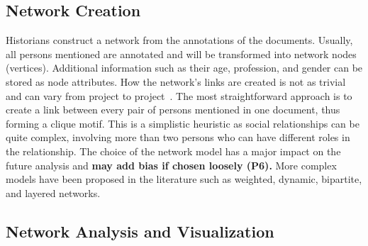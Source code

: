 \subsection{Network Creation}
Historians construct a network from the annotations of the documents.
Usually, all persons mentioned are annotated and will be transformed into network nodes (vertices).
Additional information such as their age, profession, and gender can be stored as node attributes.
How the network's links are created is not as trivial and can vary from project to project~\cite{alkadi2022}.
The most straightforward approach is to create a link between every pair of persons mentioned in one document, thus forming a clique motif.
This is a simplistic heuristic as social relationships can be quite complex, involving more than two persons who can have different roles in the relationship.
The choice of the network model has a major impact on the future analysis and \textbf{may add bias if chosen loosely (P6).}
More complex models have been proposed in the literature such as weighted, dynamic, bipartite, and layered networks. %


\subsection{Network Analysis and Visualization}

